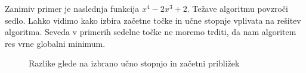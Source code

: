 \documentclass{article}
\begin{document}
\newpage
\noindent Zanimiv primer je naslednja funkcija $x^4-2x^3+2$. Težave algoritmu povzroči sedlo. Lahko vidimo kako izbira začetne točke in učne stopnje vplivata na rešitev algoritma. Seveda v primerih sedelne točke ne moremo trditi, da nam algoritem res vrne globalni minimum.\\
\begin{figure}[!htb]
    \centering
    \caption{Razlike glede na izbrano učno stopnjo in začetni približek}
    \label{fig:foobar}
\end{figure}
\end{document}

